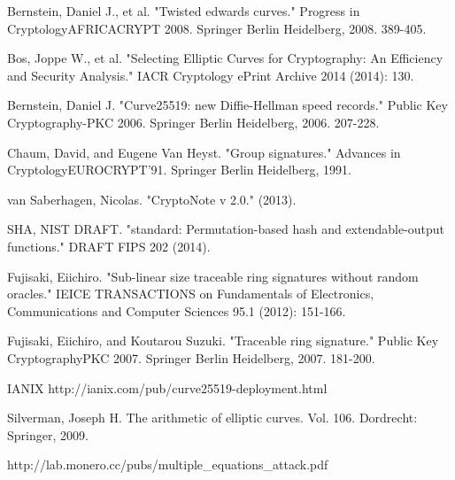 \documentclass[12pt,english]{mrl}
\numberwithin{equation}{section}
\numberwithin{figure}{section}
\begin{document}
\begin{thebibliography}{BBJLP}
 Bernstein, Daniel J., et al. "Twisted
edwards curves." Progress in Cryptology\textendash{}AFRICACRYPT
2008. Springer Berlin Heidelberg, 2008. 389-405.

 Bos, Joppe W., et al. "Selecting
Elliptic Curves for Cryptography: An Efficiency and Security Analysis."
IACR Cryptology ePrint Archive 2014 (2014): 130.

 Bernstein, Daniel J. "Curve25519:
new Diffie-Hellman speed records." Public Key Cryptography-PKC
2006. Springer Berlin Heidelberg, 2006. 207-228.

 Chaum, David, and Eugene Van Heyst. "Group
signatures." Advances in Cryptology\textemdash{}EUROCRYPT\textquoteright{}91.
Springer Berlin Heidelberg, 1991.

 van Saberhagen, Nicolas. "CryptoNote
v 2.0." (2013).

 SHA, NIST DRAFT. "standard: Permutation-based
hash and extendable-output functions." DRAFT FIPS 202
(2014).

 Fujisaki, Eiichiro. "Sub-linear size
traceable ring signatures without random oracles." IEICE
TRANSACTIONS on Fundamentals of Electronics, Communications and Computer
Sciences 95.1 (2012): 151-166.

 Fujisaki, Eiichiro, and Koutarou Suzuki. "Traceable
ring signature." Public Key Cryptography\textendash{}PKC
2007. Springer Berlin Heidelberg, 2007. 181-200.

 IANIX http://ianix.com/pub/curve25519-deployment.html

 Silverman, Joseph H. The arithmetic of elliptic
curves. Vol. 106. Dordrecht: Springer, 2009.

 http://lab.monero.cc/pubs/multiple\_equations\_attack.pdf\end{thebibliography}
\end{document}
